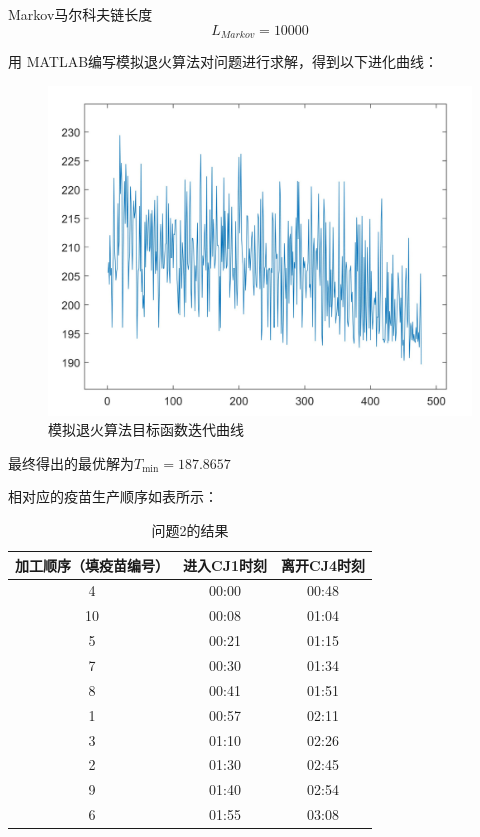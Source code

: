 \documentclass[UTF8]{ctexart}
\begin{document}
\begin{enumerate}
		\qquad Markov马尔科夫链长度
		\begin{equation*}
		L_{Markov} = 10000
		\end{equation*}
		
		\qquad 用 MATLAB编写模拟退火算法对问题进行求解，得到以下进化曲线：
		\begin{figure}[H]
			\centering %
			\includegraphics[scale=0.5]{2_moni.jpg}
			\caption{模拟退火算法目标函数迭代曲线}
		\end{figure}

	最终得出的最优解为$ T_{\min} = 187.8657 $
	
	相对应的疫苗生产顺序如表所示：
	\begin{table}[H]
		\centering
		\caption{问题2的结果}
		\begin{tabular}{ c| c| c }
			\hline
			加工顺序（填疫苗编号） & 进入CJ1时刻 & 离开CJ4时刻 \\
			\hline
			 4 & 00:00 & 00:48 \\
			 \hline
			 10 & 00:08 & 01:04 \\
			 \hline
			 5 & 00:21 & 01:15 \\
			 \hline
			 7 &  00:30 & 01:34\\
			 \hline
			 8 & 00:41 & 01:51\\
			 \hline
			 1 &  00:57 & 02:11\\
			 \hline
			 3 & 01:10 & 02:26\\
			 \hline
			 2 & 01:30 & 02:45\\
			 \hline
			 9 &  01:40 & 02:54\\
			 \hline
			 6 & 01:55 & 03:08 \\
			\hline
		\end{tabular}
	\end{table}


\end{enumerate}
\end{document}
